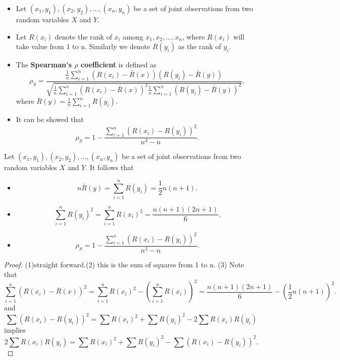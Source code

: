 \begin{refsection}
\begin{definition}\label{ch:statistical-models:def:SpearmanRhoFromObservations}\hfill
\begin{itemize}
	\item Let $(x_1,y_1),(x_2,y_2),...,(x_n,y_n)$ be a set of joint observations from two random variables $X$ and $Y$.
	\item Let $R(x_i)$ denote the rank of $x_i$ among $x_1,x_2,...,x_n$, where $R(x_i)$ will take value from 1 to n. Similarly we denote $R(y_i)$ as the rank of $y_i$. 
	\item The \textbf{Spearman's $\rho$ coefficient} is defined as
	$$\rho_S = \frac{\frac{1}{n}\sum_{i=1}^n (R(x_i) - \bar{R}(x))(R(y_i) - \bar{R}(y))}{\sqrt{\frac{1}{n}\sum_{i=1}^n (R(x_i) - \bar{R}(x))^2\frac{1}{n}\sum_{i=1}^n (R(y_i) - \bar{R}(y))^2 }},$$
	where $\bar{R}(y) = \frac{1}{n}\sum_{i=1}^n R(y_i)$.
	\item It can be showed that 
	$$\rho_S = 1 - \frac{\sum_{i=1}^{n}(R(x_i) - R(y_i))^2}{n^3-n}.$$
\end{itemize}	
\end{definition}

\begin{lemma}
Let $(x_1,y_1),(x_2,y_2),...,(x_n,y_n)$ be a set of joint observations from two random variables $X$ and $Y$. It follows that
\begin{itemize}
	\item $$n\bar{R}(y) = \sum_{i=1}^n R(y_i) = \frac{1}{2}n(n+1).$$
	\item $$\sum_{i=1}^n R(y_i)^2 = \sum_{i=1}^n R(x_i)^2 = \frac{n(n+1)(2n+1)}{6}.$$
	\item $$\rho_S = 1 - \frac{\sum_{i=1}^{n}(R(x_i) - R(y_i))^2}{n^3-n}.$$
\end{itemize}	
\end{lemma}
\begin{proof}
(1)straight forward.(2) this is the sum of squares from 1 to n. (3)
Note that
$$\sum_{i=1}^n (R(x_i) - \bar{R}(x))^2 = \sum_{i=1}^n R(x_i)^2 - (\sum_{i=1}^n R(x_i))^2 = \frac{n(n+1)(2n+1)}{6} - (\frac{1}{2}n(n+1))^2.$$
and
$$\sum (R(x_i) - R(y_i))^2 = \sum R(x_i)^2 + \sum R(y_i)^2 - 2\sum R(x_i)R(y_i)$$
implies 
$$2\sum R(x_i)R(y_i) =\sum R(x_i)^2 + \sum R(y_i)^2 - \sum (R(x_i) - R(y_i))^2. $$ 	
\end{proof}


\end{refsection}

